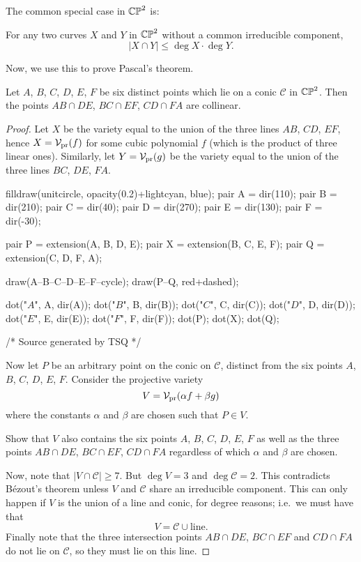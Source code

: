 The common special case in $\mathbb{CP}^2$ is:
\begin{corollary}
	For any two curves $X$ and $Y$ in $\mathbb{CP}^2$ without
	a common irreducible component,
	\[ \left\lvert X \cap Y \right\rvert
		\le \deg X \cdot \deg Y. \]
\end{corollary}

Now, we use this to prove Pascal's theorem.
\begin{theorem}
	Let $A$, $B$, $C$, $D$, $E$, $F$ be six
	distinct points which lie on a conic $\mathscr C$ in $\mathbb{CP}^2$.
	Then the points $AB \cap DE$, $BC \cap EF$, $CD \cap FA$ are collinear.
\end{theorem}
\begin{proof}
	Let $X$ be the variety equal to the union of the
	three lines $AB$, $CD$, $EF$, hence $X = \mathcal V_{\text{pr}}(f)$
	for some cubic polynomial $f$ (which is the product of three linear ones).
	Similarly, let $Y = \mathcal V_{\text{pr}}(g)$ be the variety
	equal to the union of the three lines $BC$, $DE$, $FA$.

	\begin{center}
		\begin{asy}
			filldraw(unitcircle, opacity(0.2)+lightcyan, blue);
			pair A = dir(110);
			pair B = dir(210);
			pair C = dir(40);
			pair D = dir(270);
			pair E = dir(130);
			pair F = dir(-30);

			pair P = extension(A, B, D, E);
			pair X = extension(B, C, E, F);
			pair Q = extension(C, D, F, A);

			draw(A--B--C--D--E--F--cycle);
			draw(P--Q, red+dashed);

			dot("$A$", A, dir(A));
			dot("$B$", B, dir(B));
			dot("$C$", C, dir(C));
			dot("$D$", D, dir(D));
			dot("$E$", E, dir(E));
			dot("$F$", F, dir(F));
			dot(P);
			dot(X);
			dot(Q);

			/* Source generated by TSQ */
		\end{asy}
	\end{center}

	Now let $P$ be an arbitrary point on the conic on $\mathscr C$,
	distinct from the six points $A$, $B$, $C$, $D$, $E$, $F$.
	Consider the projective variety
	\[ V = \mathcal V_{\text{pr}}(\alpha f + \beta g) \]
	where the constants $\alpha$ and $\beta$ are chosen such that $P \in V$.
	\begin{ques}
		Show that $V$ also contains the six points $A$, $B$, $C$, $D$, $E$, $F$
		as well as the three points $AB \cap DE$, $BC \cap EF$, $CD \cap FA$
		regardless of which $\alpha$ and $\beta$ are chosen.
	\end{ques}

	Now, note that $|V \cap \mathscr C| \ge 7$.
	But $\deg V = 3$ and $\deg \mathscr C = 2$.
	This contradicts B\'ezout's theorem unless $V$ and $\mathscr C$
	share an irreducible component.
	This can only happen if $V$ is the union of a line and conic,
	for degree reasons; i.e.\ we must have that
	\[ V = \mathscr C \cup \text{line}. \]
	Finally note that the three intersection points $AB \cap DE$,
	$BC \cap EF$ and $CD \cap FA$ do not lie on $\mathscr C$,
	so they must lie on this line.
\end{proof}


